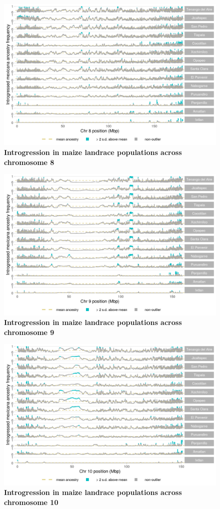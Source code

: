 \begin{figure}[ht]
\includegraphics[width=.85\textwidth]{chapter2/figures/maize_shared_outliers_chr_8.png}
\caption{\color{Gray} \textbf{Introgression in maize landrace populations across chromosome 8}}
\label{maize_chr8}
\end{figure}

\begin{figure}[ht]
\includegraphics[width=.85\textwidth]{chapter2/figures/maize_shared_outliers_chr_9.png}
\caption{\color{Gray} \textbf{Introgression in maize landrace populations across chromosome 9}}
\label{maize_chr9}
\end{figure}

\begin{figure}[ht]
\includegraphics[width=.85\textwidth]{chapter2/figures/maize_shared_outliers_chr_10.png}
\caption{\color{Gray} \textbf{Introgression in maize landrace populations across chromosome 10}}
\label{maize_chr10}
\end{figure}

